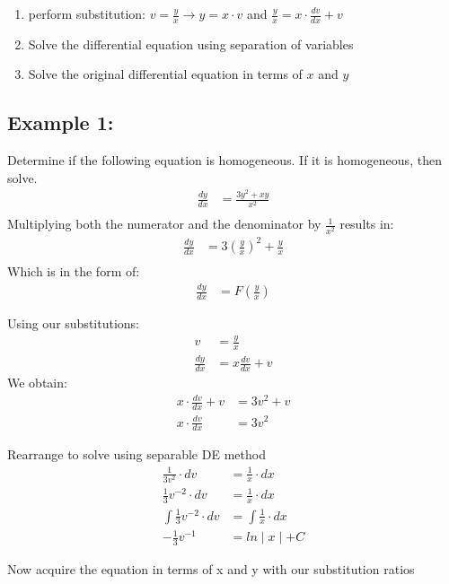 \documentclass{article}
\begin{document}
\begin{flushleft}
{\begin{enumerate}
\item perform substitution: $ v = \frac{y}{x} \rightarrow y = x \cdot v$ and $\frac{y}{x} = x \cdot \frac{dv}{dx} + v $
\item Solve the differential equation using separation of variables
\item Solve the original differential equation in terms of $x$ and $y$
\end{enumerate}
\bigskip
\subsection*{\textbf{Example 1:}}
Determine if the following equation is homogeneous. If it is homogeneous, then solve.
\begin{align*}
\frac{dy}{dx} & = \frac{3y^2 +xy}{x^2}\\
\end{align*}
Multiplying both the numerator and the denominator by $\frac{1}{x^2}$ results in:
\begin{align*}
\frac{dy}{dx} & = 3(\frac{y}{x})^2+\frac{y}{x}\\
\end{align*}
Which is in the form of:
\begin{align*}
\frac{dy}{dx} & = F (\frac{y}{x})
\end{align*}

Using our substitutions:
\begin{align*}
v & = \frac{y}{x}\\
\frac{dy}{dx} & = x \frac{dv}{dx} + v
 \end{align*}
We obtain:
\begin{align*}
x \cdot \frac{dv}{dx} + v & = 3v^2 + v\\
x \cdot  \frac{dv}{dx}  & = 3v^2 
\end{align*}

Rearrange to solve using separable DE method
\begin{align*}
\frac{1}{3v^2} \cdot dv & = \frac{1}{x} \cdot dx \\
\frac{1}{3} v^{-2} \cdot dv & = \frac{1}{x} \cdot dx \\
\int \frac{1}{3} v^{-2} \cdot dv & = \int \frac{1}{x} \cdot dx  \\
-\frac{1}{3}v^{-1} & = ln\mid x \mid + C
\end{align*}

Now acquire the equation in terms of x and y with our substitution ratios

}
\end{flushleft}
\end{document}
